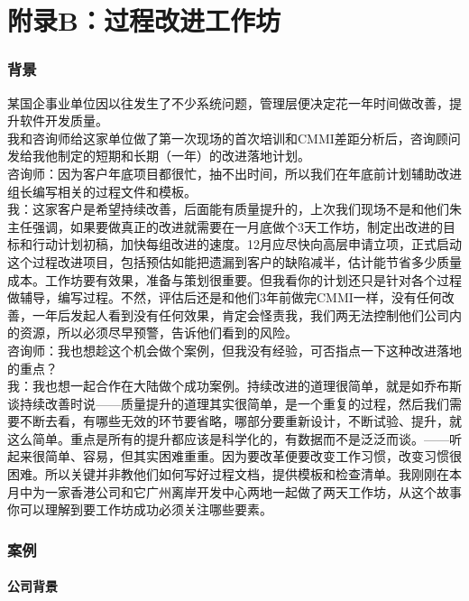 \chapter{附录B：过程改进工作坊} %

\hypertarget{ux80ccux666f}{%
\subsection{背景}\label{ux80ccux666f}}

某国企事业单位因以往发生了不少系统问题，管理层便决定花一年时间做改善，提升软件开发质量。\\
我和咨询师给这家单位做了第一次现场的首次培训和CMMI差距分析后，咨询顾问发给我他制定的短期和长期（一年）的改进落地计划。\\
咨询师：因为客户年底项目都很忙，抽不出时间，所以我们在年底前计划辅助改进组长编写相关的过程文件和模板。\\
我：这家客户是希望持续改善，后面能有质量提升的，上次我们现场不是和他们朱主任强调，如果要做真正的改进就需要在一月底做个3天工作坊，制定出改进的目标和行动计划初稿，加快每组改进的速度。12月应尽快向高层申请立项，正式启动这个过程改进项目，包括预估如能把遗漏到客户的缺陷减半，估计能节省多少质量成本。工作坊要有效果，准备与策划很重要。但我看你的计划还只是针对各个过程做辅导，编写过程。不然，评估后还是和他们3年前做完CMMI一样，没有任何改善，一年后发起人看到没有任何效果，肯定会怪责我，我们两无法控制他们公司内的资源，所以必须尽早预警，告诉他们看到的风险。\\
咨询师：我也想趁这个机会做个案例，但我没有经验，可否指点一下这种改进落地的重点？\\
我：我也想一起合作在大陆做个成功案例。持续改进的道理很简单，就是如乔布斯谈持续改善时说------质量提升的道理其实很简单，是一个重复的过程，然后我们需要不断去看，有哪些无效的环节要省略，哪部分要重新设计，不断试验、提升，就这么简单。重点是所有的提升都应该是科学化的，有数据而不是泛泛而谈。------听起来很简单、容易，但其实困难重重。因为要改革便要改变工作习惯，改变习惯很困难。所以关键并非教他们如何写好过程文档，提供模板和检查清单。我刚刚在本月中为一家香港公司和它广州离岸开发中心两地一起做了两天工作坊，从这个故事你可以理解到要工作坊成功必须关注哪些要素。

\hypertarget{ux6848ux4f8b}{%
\subsection{案例}\label{ux6848ux4f8b}}

\hypertarget{ux516cux53f8ux80ccux666f}{%
\subsubsection{公司背景}\label{ux516cux53f8ux80ccux666f}}

